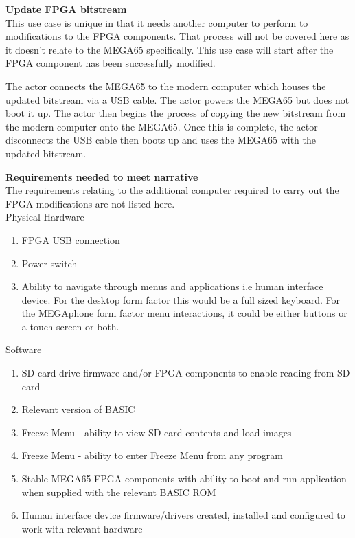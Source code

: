 \textbf{Update FPGA bitstream}\\
This use case is unique in that it needs another computer to perform to modifications to the FPGA components. That process will not be covered here as it doesn't relate to the MEGA65 specifically. This use case will start after the FPGA component has been successfully modified.

The actor connects the MEGA65 to the modern computer which houses the updated bitstream via a USB cable. The actor powers the MEGA65 but does not boot it up. The actor then begins the process of copying the new bitstream from the modern computer onto the MEGA65. Once this is complete, the actor disconnects the USB cable then boots up and uses the MEGA65 with the updated bitstream.

\textbf{Requirements needed to meet narrative}\\
The requirements relating to the additional computer required to carry out the FPGA modifications are not listed here.\\
Physical Hardware
\begin{enumerate}
\item FPGA USB connection
\item Power switch
\item Ability to navigate through menus and applications i.e human interface device. For the desktop form factor this would be a full sized keyboard. For the MEGAphone form factor menu interactions, it could be either buttons or a touch screen or both.
\end{enumerate}

Software\\
\begin{enumerate}
\item SD card drive firmware and/or FPGA components to enable reading from SD card
\item Relevant version of BASIC 
\item Freeze Menu - ability to view SD card contents and load images
\item Freeze Menu - ability to enter Freeze Menu from any program
\item Stable MEGA65 FPGA components with ability to boot and run application when supplied with the relevant BASIC ROM
\item Human interface device firmware/drivers created, installed and configured to work with relevant hardware
\end{enumerate}

